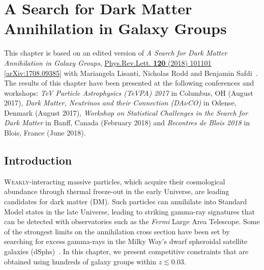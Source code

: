 \chapter{A Search for Dark Matter Annihilation in Galaxy Groups}
\label{ch:groups_data}

This chapter is based on an edited version of \emph{A Search for Dark Matter Annihilation in Galaxy Groups},  \href{https://journals.aps.org/prl/abstract/10.1103/PhysRevLett.120.101101}{Phys.Rev.Lett. \textbf{120} (2018) 101101} \href{https://arxiv.org/abs/1708.09385}{[arXiv:1708.09385]} with Mariangela Lisanti, Nicholas Rodd and Benjamin Safdi~\cite{Lisanti:2017qlb}. The results of this chapter have been presented at the following conferences and workshops: \emph{TeV Particle Astrophysics (TeVPA) 2017} in Columbus, OH (August 2017), \emph{Dark Matter, Neutrinos and their Connection (DA$\nu$CO)} in Odense, Denmark (August 2017), \emph{Workshop on Statistical Challenges in the Search for Dark Matter} in Banff, Canada (February 2018) and \emph{Recontres de Blois 2018} in Blois, France (June 2018).

\section{Introduction}

\lettrine[lines=3]{W}{eakly}-interacting massive particles, which acquire their cosmological abundance through thermal freeze-out in the early Universe, are leading candidates for dark matter (DM).  Such particles can annihilate into Standard Model states in the late Universe, leading to striking gamma-ray signatures that can be detected with observatories such as the {\it Fermi} Large Area Telescope.  
Some of the strongest limits on the annihilation cross section have been set by searching for excess gamma-rays in the Milky Way's dwarf spheroidal satellite galaxies (dSphs)~\cite{Ackermann:2015zua,Fermi-LAT:2016uux}.  In this chapter, we present competitive constraints that are obtained using hundreds of galaxy groups within $z\lesssim0.03$. 

